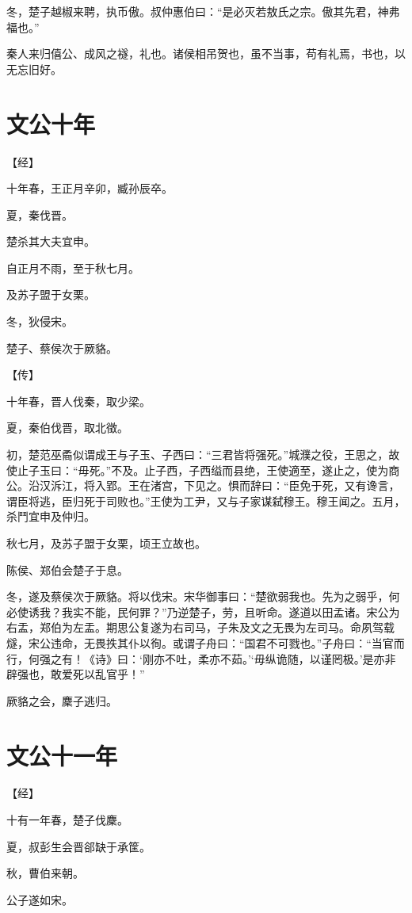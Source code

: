 \documentclass[a4paper,12pt,UTF8,twoside]{ctexbook}
\begin{document}
冬，楚子越椒来聘，执币傲。叔仲惠伯曰：“是必灭若敖氏之宗。傲其先君，神弗福也。”

秦人来归僖公、成风之襚，礼也。诸侯相吊贺也，虽不当事，苟有礼焉，书也，以无忘旧好。

\section{文公十年}



【经】

十年春，王正月辛卯，臧孙辰卒。

夏，秦伐晋。

楚杀其大夫宜申。

自正月不雨，至于秋七月。

及苏子盟于女栗。

冬，狄侵宋。

楚子、蔡侯次于厥貉。

【传】

十年春，晋人伐秦，取少梁。

夏，秦伯伐晋，取北徵。

初，楚范巫矞似谓成王与子玉、子西曰：“三君皆将强死。”城濮之役，王思之，故使止子玉曰：“毋死。”不及。止子西，子西缢而县绝，王使適至，遂止之，使为商公。沿汉泝江，将入郢。王在渚宫，下见之。惧而辞曰：“臣免于死，又有谗言，谓臣将逃，臣归死于司败也。”王使为工尹，又与子家谋弑穆王。穆王闻之。五月，杀鬥宜申及仲归。

秋七月，及苏子盟于女栗，顷王立故也。

陈侯、郑伯会楚子于息。

冬，遂及蔡侯次于厥貉。将以伐宋。宋华御事曰：“楚欲弱我也。先为之弱乎，何必使诱我？我实不能，民何罪？”乃逆楚子，劳，且听命。遂道以田孟诸。宋公为右盂，郑伯为左盂。期思公复遂为右司马，子朱及文之无畏为左司马。命夙驾载燧，宋公违命，无畏抶其仆以徇。或谓子舟曰：“国君不可戮也。”子舟曰：“当官而行，何强之有！《诗》曰：‘刚亦不吐，柔亦不茹。’‘毋纵诡随，以谨罔极。’是亦非辟强也，敢爱死以乱官乎！”

厥貉之会，麇子逃归。


\section{文公十一年}


【经】

十有一年春，楚子伐麇。

夏，叔彭生会晋郤缺于承筐。

秋，曹伯来朝。

公子遂如宋。
\end{document}
